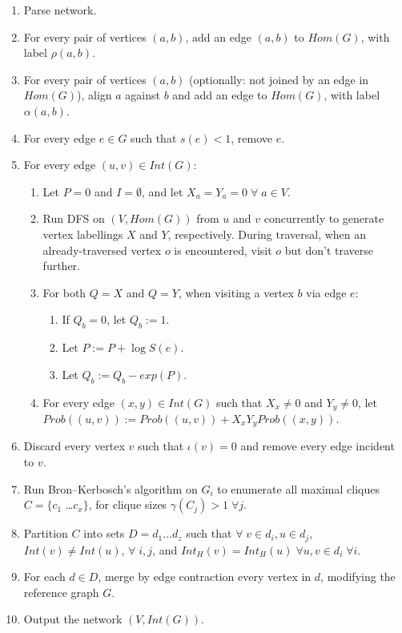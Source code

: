 \documentclass[11pt]{article}
\begin{document}
\begin{enumerate}
\item Parse network.
\item For every pair of vertices $(a,b)$, add an edge $(a,b)$ to $Hom(G)$, with label $\rho(a,b)$.
\item For every pair of vertices $(a,b)$ (optionally: not joined by an edge in $Hom(G)$), align $a$ against $b$ and add an edge to $Hom(G)$, with label $\alpha(a,b)$.
\item For every edge $e \in G$ such that $s(e) < 1$, remove $e$.
\item For every edge $(u,v) \in Int(G)$:
\begin{enumerate}
\item Let $P=0$ and $I=\emptyset$, and let $X_a = Y_a = 0 \; \forall \; a \in V$.
\item Run DFS on $(V, Hom(G))$ from $u$ and $v$ concurrently to generate vertex labellings $X$ and $Y$, respectively. During traversal, when an already-traversed vertex $o$ is encountered, visit $o$ but don't traverse further.
\item For both $Q=X$ and $Q=Y$, when visiting a vertex $b$ via edge $e$:
\begin{enumerate}
\item If $Q_b=0$, let $Q_b := 1$.
\item Let $P := P + \log S(e)$.
\item Let $Q_b := Q_b - exp(P)$.
\end{enumerate}
\item For every edge $(x,y) \in Int(G)$ such that $X_x \neq 0$ and $Y_y \neq 0$, let $Prob((u,v)) := Prob((u,v)) + X_x Y_y Prob((x,y))$.
\end{enumerate}
\item Discard every vertex $v$ such that $\iota(v) = 0$ and remove every edge incident to $v$.
\item Run Bron--Kerbosch's algorithm on $G_i$ to enumerate all maximal cliques $C = \{ c_1$ \ldots $c_x \}$, for clique sizes $\gamma(C_j) > 1 \; \forall j$.
\item Partition $C$ into sets $D = d_1 \ldots d_z$ such that $\forall \; v \in d_i, u \in d_j$, $Int(v) \neq Int(u)$, $\forall \; i,j$, and $Int_H(v) = Int_H(u) \; \forall u,v \in d_i \; \forall i$.
\item For each $d \in D$, merge by edge contraction every vertex in $d$, modifying the reference graph $G$.
\item Output the network $(V, Int(G))$.
\end{enumerate}
\end{document}
